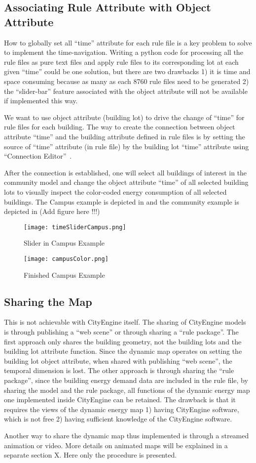 \subsection{Associating Rule Attribute with Object Attribute}
How to globally set all ``time'' attribute for each rule file is a key
problem to solve to implement the time-navigation. Writing a python
code for processing all the rule files as pure text files and apply
rule files to its corresponding lot at each given ``time'' could be
one solution, but there are two drawbacks 1) it is time and space
consuming because as many as each 8760 rule files need to be
generated 2) the ``slider-bar'' feature associated with the object
attribute will not be available if implemented this way.

We want to use object attribute (building lot) to drive the change of
``time'' for rule files for each building. The way to create the
connection between object attribute ``time'' and the building
attribute defined in rule files is by setting the source of ``time''
attribute (in rule file) by the building lot ``time'' attribute using
``Connection Editor''~\cite{cityEngineAttConect2015}.

After the connection is established, one will select all buildings of
interest in the community model and change the object attribute
``time'' of all selected building lots to visually inspect the
color-coded energy consumption of all selected buildings. The Campus
example is depicted in  and the community
example is depicted in (Add figure here !!!)
\begin{figure}[h!]
  \centering
  \texttt{[image: timeSliderCampus.png]}
  \caption[Slider in Campus Example]{Slider in Campus Example}
  \label{fig:timeSliderCampus}
\end{figure}
\begin{figure}[h!]
  \centering
  \texttt{[image: campusColor.png]}
  \caption[Finished Campus Example]{Finished Campus Example}
  \label{fig:campusColor}
\end{figure}

\subsection{Sharing the Map}
This is not achievable with CityEngine itself. The sharing of
CityEngine models is through publishing a ``web scene'' or through
sharing a ``rule package''. The first approach only shares the
building geometry, not the building lots and the building lot
attribute function. Since the dynamic map operates on setting the
building lot object attribute, when shared with publishing ``web
scene'', the temporal dimension is lost. The other approach is through
sharing the ``rule package'', since the building energy demand data
are included in the rule file, by sharing the model and the rule
package, all functions of the dynamic energy map one implemented
inside CityEngine can be retained. The drawback is that it requires
the views of the dynamic energy map 1) having CityEngine software,
which is not free 2) having sufficient knowledge of the CityEngine
software.

Another way to share the dynamic map thus implemented is through a
streamed animation or video. More details on animated maps will be
explained in a separate section X. Here only the procedure is
presented.

